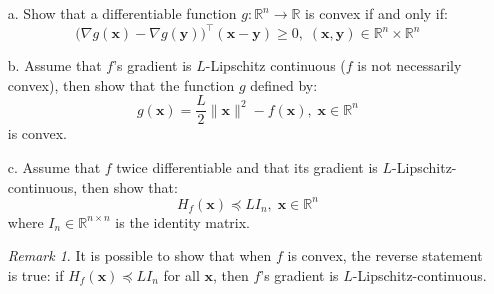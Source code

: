 \documentclass[11pt]{article}
\theoremstyle{remark}
\newtheorem*{rem*}{Remark}
\newcommand{\R}{\mathbb{R}}                     %
\newcommand{\bx}{\mathbf{x}}
\newcommand{\by}{\mathbf{y}}
\begin{document}
\begin{itemize}
    \item[a.] Show that a differentiable function $g:\R^n\to\R$ is convex if
        and only if:
        \begin{displaymath}
            \big(\nabla g(\bx) - \nabla g(\by)\big)^\intercal (\bx-\by) \geq
            0,\; (\bx,\by)\in\R^n\times\R^n
        \end{displaymath}
    \item[b.] Assume that $f$'s gradient is $L$-Lipschitz continuous ($f$ is
        not necessarily convex), then show that the function $g$ defined by:
        \begin{displaymath}
            g(\bx) = \frac{L}{2}\|\bx\|^2 - f(\bx),\;\bx\in\R^n
        \end{displaymath}
        is convex.
    \item[c.] Assume that $f$ twice differentiable and that its
        gradient is $L$-Lipschitz-continuous, then show that:
        \begin{displaymath}
            H_f(\bx) \preceq LI_n,\; \bx\in\R^n
        \end{displaymath}
        where $I_n\in\R^{n\times n}$ is the identity matrix.
\begin{rem*} It is possible to show that when $f$ is convex, the reverse
    statement is true: if $H_f(\bx)\preceq LI_n$ for all $\bx$, then $f$'s
    gradient is $L$-Lipschitz-continuous.
\end{rem*}
\end{itemize}
\end{document}
